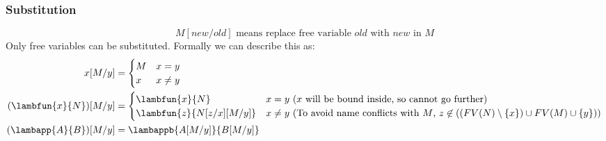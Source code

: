 \documentclass{report}
\begin{document}
            \subsubsection*{Substitution}
                \[M [new / old] \text{ means replace free variable $old$ with $new$ in $M$}\]
                Only free variables can be substituted.
                Formally we can describe this as:
                \[\begin{split}
                    x[M/y] &= \begin{cases}
                        M & x = y \\
                        x & x \neq y \\
                    \end{cases} \\
                    (\lambfun{x}{N})[M/y] &= \begin{cases}
                        \lambfun{x}{N} & x = y \ \text{($x$ will be bound inside, so cannot go further)} \\
                        \lambfun{z}{N[z/x][M/y]} & x \neq y \ \text{(To avoid name conflicts with $M$, $z \not\in ((FV(N) \setminus \{x\}) \cup FV(M) \cup \{y\})$)}
                    \end{cases} \\
                    (\lambapp{A}{B})[M/y] &= \lambappb{A[M/y]}{B[M/y]} \\
                \end{split}\]
        
\end{document}
